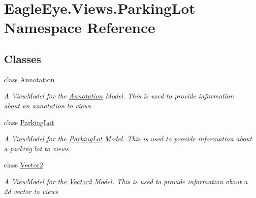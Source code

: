 \hypertarget{namespace_eagle_eye_1_1_views_1_1_parking_lot}{}\section{Eagle\+Eye.\+Views.\+Parking\+Lot Namespace Reference}
\label{namespace_eagle_eye_1_1_views_1_1_parking_lot}
\subsection*{Classes}
\begin{DoxyCompactItemize}
\item 
class \mbox{\hyperlink{class_eagle_eye_1_1_views_1_1_parking_lot_1_1_annotation}{Annotation}}
\begin{DoxyCompactList}\small\item\em A View\+Model for the \mbox{\hyperlink{class_eagle_eye_1_1_views_1_1_parking_lot_1_1_annotation}{Annotation}} Model. This is used to provide information about an annotation to views \end{DoxyCompactList}\item 
class \mbox{\hyperlink{class_eagle_eye_1_1_views_1_1_parking_lot_1_1_parking_lot}{Parking\+Lot}}
\begin{DoxyCompactList}\small\item\em A View\+Model for the \mbox{\hyperlink{class_eagle_eye_1_1_views_1_1_parking_lot_1_1_parking_lot}{Parking\+Lot}} Model. This is used to provide information about a parking lot to views \end{DoxyCompactList}\item 
class \mbox{\hyperlink{class_eagle_eye_1_1_views_1_1_parking_lot_1_1_vector2}{Vector2}}
\begin{DoxyCompactList}\small\item\em A View\+Model for the \mbox{\hyperlink{class_eagle_eye_1_1_views_1_1_parking_lot_1_1_vector2}{Vector2}} Model. This is used to provide information about a 2d vector to views \end{DoxyCompactList}\end{DoxyCompactItemize}
